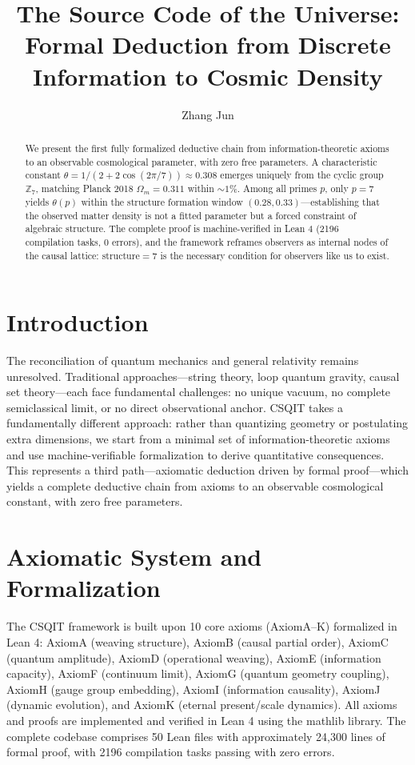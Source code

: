 \documentclass[aps,prl,twocolumn,nofootinbib,floatfix]{revtex4-2}
\title{The Source Code of the Universe: Formal Deduction from Discrete Information to Cosmic Density}
\author{Zhang Jun}
\affiliation{New Beginning Universe Research Group (Independent Researcher)}
\begin{document}
\maketitle

\begin{abstract}
We present the first fully formalized deductive chain from information-theoretic axioms to an observable cosmological parameter, with zero free parameters. A characteristic constant $\theta = 1/(2+2\cos(2\pi/7)) \approx 0.308$ emerges uniquely from the cyclic group $\mathbb{Z}_7$, matching Planck 2018 $\Omega_m = 0.311$ within $\sim 1\%$. Among all primes $p$, only $p=7$ yields $\theta(p)$ within the structure formation window $(0.28, 0.33)$---establishing that the observed matter density is not a fitted parameter but a forced constraint of algebraic structure. The complete proof is machine-verified in Lean 4 (2196 compilation tasks, 0 errors), and the framework reframes observers as internal nodes of the causal lattice: structure$=7$ is the necessary condition for observers like us to exist.
\end{abstract}

\section{Introduction}

The reconciliation of quantum mechanics and general relativity remains unresolved. Traditional approaches---string theory, loop quantum gravity, causal set theory---each face fundamental challenges: no unique vacuum, no complete semiclassical limit, or no direct observational anchor. CSQIT takes a fundamentally different approach: rather than quantizing geometry or postulating extra dimensions, we start from a minimal set of information-theoretic axioms and use machine-verifiable formalization to derive quantitative consequences. This represents a third path---axiomatic deduction driven by formal proof---which yields a complete deductive chain from axioms to an observable cosmological constant, with zero free parameters.

\section{Axiomatic System and Formalization}

The CSQIT framework is built upon 10 core axioms (AxiomA--K) formalized in Lean 4: AxiomA (weaving structure), AxiomB (causal partial order), AxiomC (quantum amplitude), AxiomD (operational weaving), AxiomE (information capacity), AxiomF (continuum limit), AxiomG (quantum geometry coupling), AxiomH (gauge group embedding), AxiomI (information causality), AxiomJ (dynamic evolution), and AxiomK (eternal present/scale dynamics). All axioms and proofs are implemented and verified in Lean 4 using the mathlib library. The complete codebase comprises 50 Lean files with approximately 24,300 lines of formal proof, with 2196 compilation tasks passing with zero errors.
\end{document}

